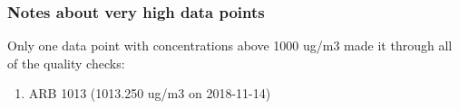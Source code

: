 \subsubsection{Notes about very high data points}

Only one data point with concentrations above 1000 ug/m3 made it through all of the quality checks:

\begin{enumerate}[nolistsep]
\item ARB 1013 (1013.250 ug/m3 on 2018-11-14)
\end{enumerate}

